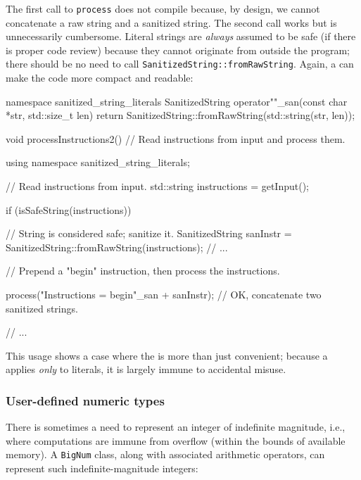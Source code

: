 \noindent The first call to \lstinline!process! does not compile because, by design,
we cannot concatenate a raw string and a sanitized string. The second
call works but is unnecessarily cumbersome. Literal strings are
\emph{always} assumed to be safe (if there is proper code review)
because they cannot originate from outside the program; there should be
no need to call \lstinline!SanitizedString::fromRawString!. Again, a
 can make the code more compact and readable:

\begin{emcppslisting}[emcppsbatch=e15]
namespace sanitized_string_literals
{
    SanitizedString operator""_san(const char *str, std::size_t len)
    {
        return SanitizedString::fromRawString(std::string(str, len));
    }
}

void processInstructions2()
    // Read instructions from input and process them.
{
    using namespace sanitized_string_literals;

    // Read instructions from input.
    std::string instructions = getInput();

    if (isSafeString(instructions))
    {
       // String is considered safe; sanitize it.
       SanitizedString sanInstr = SanitizedString::fromRawString(instructions);
       // ...

       // Prepend a "begin" instruction, then process the instructions.

       process("Instructions = begin\n"_san + sanInstr);
           // OK, concatenate two sanitized strings.
    }
    // ...
}
\end{emcppslisting}
    
\noindent This usage shows a case where the  is more than just
convenient; because a  applies \emph{only} to literals, it
is largely immune to accidental misuse.

\subsubsection[User-defined numeric types]{User-defined numeric types}\label{user-defined-numeric-types}

There is sometimes a need to represent an integer of indefinite
magnitude, i.e., where computations are immune from overflow (within the
bounds of available memory). A \lstinline!BigNum! class, along with
associated arithmetic operators, can represent such indefinite-magnitude
integers:


